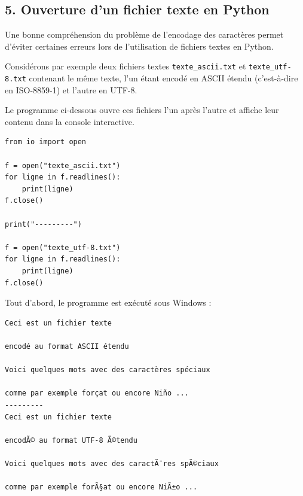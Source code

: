 \documentclass[11pt,a4paper]{article}
\begin{document}
\hypertarget{ouverture-dun-fichier-texte-en-python}{%
\subsection*{5. Ouverture d'un fichier texte en
Python}\label{ouverture-dun-fichier-texte-en-python}}

Une bonne compréhension du problème de l'encodage des caractères permet
d'éviter certaines erreurs lors de l'utilisation de fichiers textes en
Python.

Considérons par exemple deux fichiers textes \texttt{texte\_ascii.txt}
et \texttt{texte\_utf-8.txt} contenant le même texte, l'un étant encodé
en ASCII étendu (c'est-à-dire en ISO-8859-1) et l'autre en UTF-8.

Le programme ci-dessous ouvre ces fichiers l'un après l'autre et affiche
leur contenu dans la console interactive.

\begin{center}
\begin{minipage}{6cm}
\begin{verbatim}
from io import open

f = open("texte_ascii.txt")
for ligne in f.readlines():
    print(ligne)
f.close()

print("---------")

f = open("texte_utf-8.txt")
for ligne in f.readlines():
    print(ligne)
f.close()
\end{verbatim}
\end{minipage}
\end{center}

Tout d'abord, le programme est exécuté sous Windows :

\begin{center}
\begin{minipage}{11cm}
\begin{verbatim}
Ceci est un fichier texte

encodé au format ASCII étendu

Voici quelques mots avec des caractères spéciaux

comme par exemple forçat ou encore Niño ...
---------
Ceci est un fichier texte

encodÃ© au format UTF-8 Ã©tendu

Voici quelques mots avec des caractÃ¨res spÃ©ciaux

comme par exemple forÃ§at ou encore NiÃ±o ...
\end{verbatim}
\end{minipage}
\end{center}
\end{document}
